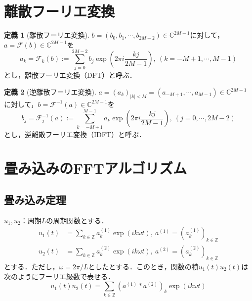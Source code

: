 \documentclass[11pt,a4paper,titlepage]{jsreport}
\theoremstyle{definition}
\newtheorem{dfn}{定義}
\begin{document}
\section{離散フーリエ変換}
\begin{dfn}[離散フーリエ変換]
  $b=(b_0,b_1,\cdots,b_{2M-2}) \in \mathbb{C}^{2M-1}$に対して，$a=\mathcal{F}(b)\in \mathbb{C}^{2M-1}$を
  \begin{equation*}
    a_k = \mathcal{F}_k(b) := \sum_{j=0}^{2M-2} b_j \exp\left(2\pi i \frac{kj}{2M-1}\right),\ (k=-M+1,\cdots,M-1)
  \end{equation*}
  とし，離散フーリエ変換（DFT）と呼ぶ．
\end{dfn}

\begin{dfn}[逆離散フーリエ変換]
  $a=(a_{k})_{|k|<M} = (a_{-M+1},\cdots,a_{M-1}) \in \mathbb{C}^{2M-1}$に対して，$b=\mathcal{F}^{-1}(a)\in \mathbb{C}^{2M-1}$を
  \begin{equation*}
    b_j = \mathcal{F}^{-1}_j(a) := \sum_{k=-M+1}^{M-1} a_k \exp\left(2\pi i \frac{kj}{2M-1}\right),\ (j=0,\cdots,2M-2)
  \end{equation*}
  とし，逆離散フーリエ変換（IDFT）と呼ぶ．
\end{dfn}

\section{畳み込みのFFTアルゴリズム}
\subsection{畳み込み定理}
$u_1,u_2$：周期$L$の周期関数とする．
\begin{align*}
  u_1(t) & = \sum_{k\in\mathbb{Z}} a_k^{(1)} \exp\left( ik\omega t \right) ,\ a^{(1)}= \left( a_k^{(1)} \right)_{k\in\mathbb{Z}} \\
  u_2(t) & = \sum_{k\in\mathbb{Z}} a_k^{(2)} \exp\left( ik\omega t \right) ,\ a^{(2)}= \left( a_k^{(2)} \right)_{k\in\mathbb{Z}}
\end{align*}
とする．ただし，$\omega = 2\pi / L$としたとする．このとき，関数の積$u_1(t)u_2(t)$は次のようにフーリエ級数で表せる．
\begin{equation*}
  u_1(t)u_2(t) = \sum_{k\in\mathbb{Z}} \left(a^{(1)} * a^{(2)}\right)_k \exp{(ik   \omega t)}
\end{equation*}
\end{document}
